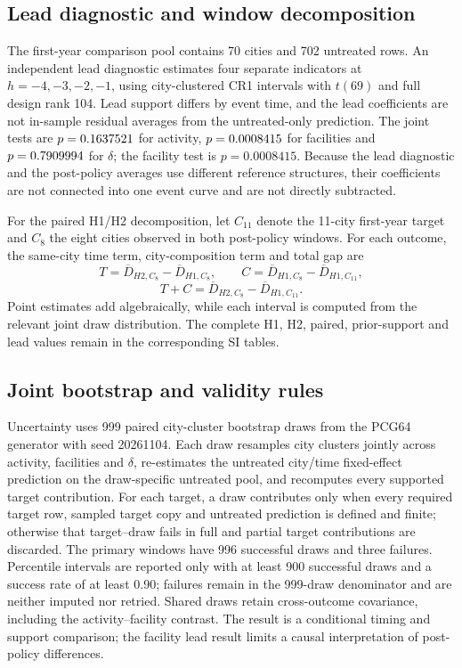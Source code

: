 \subsection{Lead diagnostic and window decomposition}
The first-year comparison pool contains 70 cities and 702 untreated rows.  An
independent lead diagnostic estimates four separate indicators at
$h=-4,-3,-2,-1$, using city-clustered CR1 intervals with $t(69)$ and full
design rank 104.  Lead support differs by event time, and the lead coefficients
are not in-sample residual averages from the untreated-only prediction.  The
joint tests are $p=0.1637521$ for activity, $p=0.0008415$ for facilities and
$p=0.7909994$ for $\delta$; the facility test is $p=0.0008415$.  Because the lead
diagnostic and the post-policy averages use different reference structures,
their coefficients are not connected into one event curve and are not directly
subtracted.

For the paired H1/H2 decomposition, let $C_{11}$ denote the 11-city first-year
target and $C_8$ the eight cities observed in both post-policy windows.  For
each outcome, the same-city time term, city-composition term and total gap are
\[
 T=\overline D_{H2,C_8}-\overline D_{H1,C_8},\qquad
 C=\overline D_{H1,C_8}-\overline D_{H1,C_{11}},
\]
\[
 T+C=\overline D_{H2,C_8}-\overline D_{H1,C_{11}}.
\]
Point estimates add algebraically, while each interval is computed from the
relevant joint draw distribution.  The complete H1, H2, paired,
prior-support and lead values remain in the corresponding SI tables.

\subsection{Joint bootstrap and validity rules}
Uncertainty uses 999 paired city-cluster bootstrap draws from the PCG64
generator with seed 20261104.  Each draw resamples city clusters jointly
across activity, facilities and $\delta$, re-estimates the untreated
city/time fixed-effect prediction on the draw-specific untreated pool, and
recomputes every supported target contribution.  For each target, a draw
contributes only when every required target row, sampled target copy and
untreated prediction is defined and finite; otherwise that target--draw fails
in full and partial target contributions are discarded.  The primary windows have 996 successful draws
and three failures.  Percentile intervals are reported only with at least 900
successful draws and a success rate of at least 0.90; failures remain in the
999-draw denominator and are neither imputed nor retried.  Shared draws retain
cross-outcome covariance, including the activity--facility contrast.  The
result is a conditional timing and support comparison; the facility lead result
limits a causal interpretation of post-policy differences.
